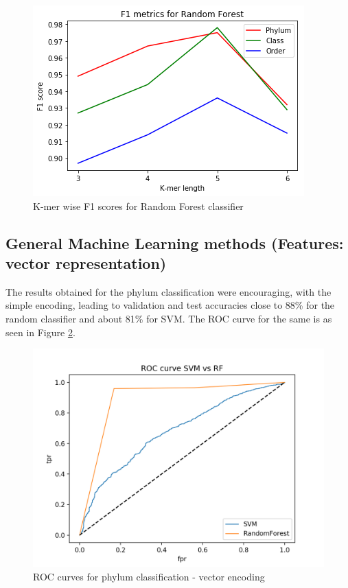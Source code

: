\documentclass[12pt]{article}
\begin{document}
        \begin{figure}[h]
        \centering
        \includegraphics[scale=0.5]{rf_kmer}
        \caption{K-mer wise F1 scores for Random Forest classifier}
        \label{fig:rf_kmer}
        \end{figure}

        \subsection{General Machine Learning methods (Features: vector representation)}
        The results obtained for the phylum classification were encouraging, with the simple encoding, leading to validation and test accuracies close to 88\% for the random classifier and about 81\% for SVM. The ROC curve for the same is as seen in Figure \ref{fig:svm_vec}.

        \begin{figure}[h]
        \centering
        \includegraphics[scale=0.5]{roc_phylumpng.png}
        \caption{ROC curves for phylum classification - vector encoding}
        \label{fig:svm_vec}
        \end{figure}
\end{document}
